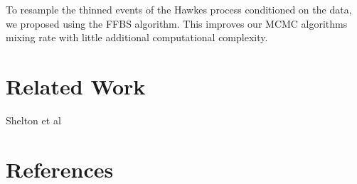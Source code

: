 \documentclass[11pt]{article}
\begin{document}
To resample the thinned events of the Hawkes process conditioned on the data, we proposed using the FFBS algorithm. This improves our MCMC algorithms mixing rate with little additional computational complexity.



\newpage
\section*{Related Work}

Shelton et al~\cite{AAAI1816985}


\newpage
\section*{References}


\end{document}
